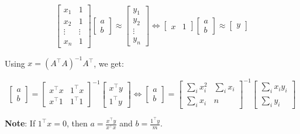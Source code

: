 \documentclass{article}
\begin{document}
$$
\begin{bmatrix}
x_1 & 1 \\
x_2 & 1 \\
\vdots & \vdots \\
x_n & 1
\end{bmatrix}\begin{bmatrix}
    a \\ b
\end{bmatrix} \approx \begin{bmatrix}
    y_1 \\ y_2 \\ \vdots \\ y_n
\end{bmatrix}  \iff \begin{bmatrix} x & 1\end{bmatrix} \begin{bmatrix} a \\ b \end{bmatrix} \approx \begin{bmatrix} y \end{bmatrix}
$$

Using $x = (A^\top A)^{-1} A^\top$, we get:

$$
\begin{bmatrix}
    a \\ b
\end{bmatrix} = \begin{bmatrix}
x^\top x & 1^\top x \\
x^\top 1 & 1^\top 1
\end{bmatrix}^{-1} \begin{bmatrix} x^\top y \\ 1^\top y\end{bmatrix} \iff 
\begin{bmatrix}
    a \\ b
\end{bmatrix} = \begin{bmatrix}
\sum_i x_i^2 & \sum_i x_i \\
\sum_i x_i & n
\end{bmatrix}^{-1} \begin{bmatrix} \sum_i x_i y_i \\ \sum_i y_i \end{bmatrix}
$$

\textbf{Note}: If $1^\top x = 0$, then $a = \frac{x^\top y}{x^\top x}$ and $b = \frac{1^\top y}{m}$.
\end{document}

